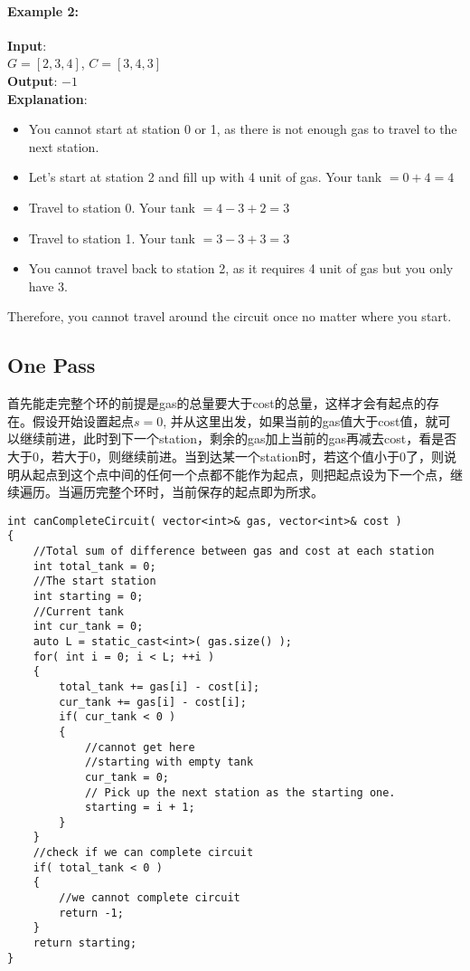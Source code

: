 \paragraph{Example 2:}
\begin{flushleft}
\textbf{Input}:
\\ 
$G  = [2,3,4]$, $C = [3,4,3]$
\\
\textbf{Output}: $-1$
\\
\textbf{Explanation}:
\begin{itemize}
\item You cannot start at station 0 or 1, as there is not enough gas to travel to the next station.
\item Let's start at station 2 and fill up with 4 unit of gas. Your tank $= 0 + 4 = 4$
\item Travel to station 0. Your tank $= 4 - 3 + 2 = 3$
\item Travel to station 1. Your tank $= 3 - 3 + 3 = 3$
\item You cannot travel back to station 2, as it requires 4 unit of gas but you only have 3.
\end{itemize}
Therefore, you cannot travel around the circuit once no matter where you start.
\end{flushleft}
\subsection{One Pass}
首先能走完整个环的前提是gas的总量要大于cost的总量，这样才会有起点的存在。假设开始设置起点$s = 0$, 并从这里出发，如果当前的gas值大于cost值，就可以继续前进，此时到下一个station，剩余的gas加上当前的gas再减去cost，看是否大于0，若大于0，则继续前进。当到达某一个station时，若这个值小于0了，则说明从起点到这个点中间的任何一个点都不能作为起点，则把起点设为下一个点，继续遍历。当遍历完整个环时，当前保存的起点即为所求。


\setcounter{lstlisting}{0}
\begin{lstlisting}[style=customc, caption={One Pass}]
int canCompleteCircuit( vector<int>& gas, vector<int>& cost )
{
    //Total sum of difference between gas and cost at each station
    int total_tank = 0;
    //The start station
    int starting = 0;
    //Current tank
    int cur_tank = 0;
    auto L = static_cast<int>( gas.size() );
    for( int i = 0; i < L; ++i )
    {
        total_tank += gas[i] - cost[i];
        cur_tank += gas[i] - cost[i];
        if( cur_tank < 0 )
        {
            //cannot get here
            //starting with empty tank
            cur_tank = 0;
            // Pick up the next station as the starting one.
            starting = i + 1;
        }
    }
    //check if we can complete circuit
    if( total_tank < 0 )
    {
        //we cannot complete circuit
        return -1;
    }
    return starting;
}
\end{lstlisting}
